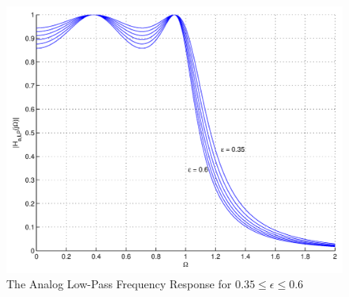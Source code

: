 \documentclass[journal,12pt,twocolumn]{IEEEtran}
\theoremstyle{remark}
\begin{document}
\begin{figure}[htbp] 
\centering
\includegraphics[width=\columnwidth]{figs/PNG/IIR/fig1.png}
\caption{The Analog Low-Pass Frequency Response for $0.35 \leq \epsilon \leq 0.6$}
\label{fig:fig1}
\end{figure}

\end{document}
